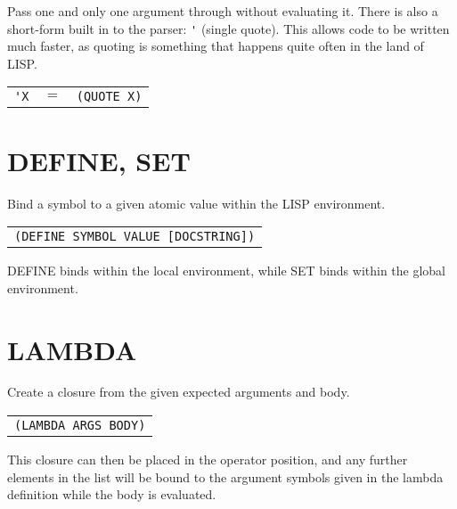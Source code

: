 \documentclass[
letterpaper,
oneside,
]{memoir}
\begin{document}
\noindent
Pass one and only one argument through without evaluating it. There is also a short-form built in to the parser: \verb|'| (single quote). This allows code to be written much faster, as quoting is something that happens quite often in the land of LISP.

\begin{center}
  \begin{tabular}{rcl}
    \verb|'X| & $=$ & \texttt{(QUOTE X)} \\
  \end{tabular}
\end{center}

\vspace{1em}

\section{DEFINE, SET}

\noindent
Bind a symbol to a given atomic value within the LISP environment.

\begin{center}
  \begin{tabular}{c}
    \texttt{(DEFINE SYMBOL VALUE [DOCSTRING])}
  \end{tabular}
\end{center}

\noindent
DEFINE binds within the local environment, while SET binds within the global environment.

\vspace{1em}

\section{LAMBDA}

\noindent
Create a closure from the given expected arguments and body.

\begin{center}
  \begin{tabular}{c}
    \texttt{(LAMBDA ARGS BODY)}
  \end{tabular}
\end{center}

\noindent
This closure can then be placed in the operator position, and any further elements in the list will be bound to the argument symbols given in the lambda definition while the body is evaluated.
\end{document}
